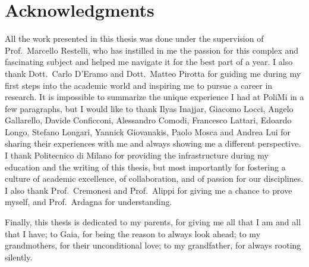 \chapter*{Acknowledgments}



All the work presented in this thesis was done under the supervision of Prof.\ Marcello 
Restelli, who has instilled in me the passion for this complex and 
fascinating subject and helped me navigate it for the best part of a year. 
I also thank Dott.\ Carlo D'Eramo and Dott.\ Matteo Pirotta for guiding me during 
my first steps into the academic world and inspiring me to pursue a career in 
research. 
It is impossible to summarize the unique experience I had at PoliMi in a few
paragraphs, but I would like to thank Ilyas Inajjar, Giacomo Locci, Angelo 
Gallarello, Davide Conficconi, Alessandro Comodi, Francesco Lattari, Edoardo
Longo, Stefano Longari, Yannick Giovanakis, Paolo Mosca and Andrea Lui for 
sharing their experiences with me and always showing me a different perspective. 
I thank Politecnico di Milano for providing the infrastructure during my education
and the writing of this thesis, but most importantly for fostering a culture 
of academic excellence, of collaboration, and of passion for our disciplines.
I also thank Prof.\ Cremonesi and Prof.\ Alippi for giving me a chance to prove 
myself, and Prof.\ Ardagna for understanding.

Finally, this thesis is dedicated to my parents, for giving me all that I am and
all that I have; 
to Gaia, for being the reason to always look ahead;
to my grandmothers, for their unconditional love; 
to my grandfather, for always rooting silently.
